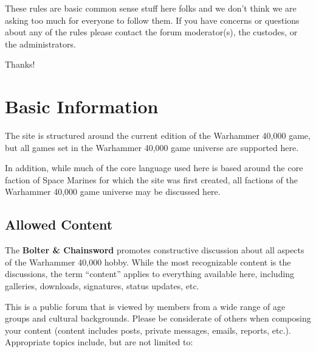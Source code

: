 \documentclass[12pt]{article}
\newcommand{\bnc}{{\textbf{Bolter \& Chainsword}}}%
\begin{document}
\clearpage



\medskip

These rules are basic common sense stuff here folks and we don't think 
we are asking too much for everyone to follow them. If you have 
concerns or questions about any of the rules please contact the forum 
moderator(s), the custodes, or the administrators.
\medskip

Thanks!

\section{Basic Information}

The site is structured around the current edition of the Warhammer 
40,000 game, but all games set in the Warhammer 40,000 game universe 
are supported here.

In addition, while much of the core language used here is based around 
the core faction of Space Marines for which the site was first created, 
all factions of the Warhammer 40,000 game universe may be discussed 
here.

\subsection{Allowed Content}

The {\bnc} promotes constructive discussion about all 
aspects of the Warhammer 40,000 hobby. While the most recognizable 
content is the discussions, the term ``content'' applies to everything 
available here, including galleries, downloads, signatures, status 
updates, etc.

This is a public forum that is viewed by members from a wide range of 
age groups and cultural backgrounds. Please be considerate of others 
when composing your content (content includes posts, private messages, 
emails, reports, etc.). Appropriate topics include, but are not limited 
to:
\end{document}
